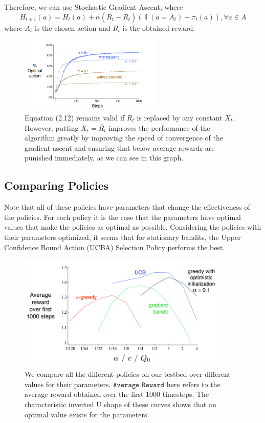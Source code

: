 \documentclass[12pt]{report}
\begin{document}
Therefore, we can use Stochastic Gradient Ascent, where
\begin{equation}
    H_{t + 1}(a) = H_{t}(a) + \alpha (R_{t} - \overline{R_{t}})(\mathop{\mathbb{I}}(a = A_{t}) - \pi_{t}(a)), \forall a \in A
\end{equation}
where $A_{t}$ is the chosen action and $R_{t}$ is the obtained reward.
\begin{figure}[h!]
    \centering
    \includegraphics[width=0.6\textwidth]{images/gradient-bandit.png}
    \caption{Equation (2.12) remains valid if $\overline{R_{t}}$ is replaced by any constant $X_{t}$. However, putting $X_{t} = \overline{R_{t}}$ improves the performance of the algorithm greatly by improving the speed of convergence of the gradient ascent and ensuring that below average rewards are punished immediately, as we can see in this graph.}
\end{figure}

\subsection{Comparing Policies}
Note that all of these policies have parameters that change the effectiveness of the policies. For each policy it is the case that the parameters have optimal values that make the policies as optimal as possible.
Considering the policies with their parameters optimized, it seems that for stationary bandits, the Upper Confidence Bound Action (UCBA) Selection Policy performs the best.
\begin{figure}[h!]
    \centering
    \includegraphics[width=0.9\textwidth]{images/compare-bandit.png}
    \caption{We compare all the different policies on our testbed over different values for their parameters. $\texttt{Average Reward}$ here refers to the average reward obtained over the first $1000$ timesteps. The characteristic inverted U shape of these curves shows that an optimal value exists for the parameters.}
\end{figure}
\end{document}
